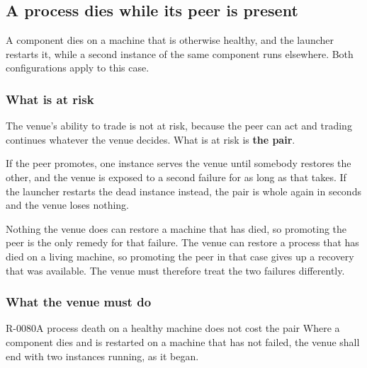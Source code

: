 \subsection{A process dies while its peer is present}
\label{sec:ha:enabled:process_death}

A component dies on a machine that is otherwise healthy, and the launcher
restarts it, while a second instance of the same component runs elsewhere. Both
configurations apply to this case.

\subsubsection{What is at risk}
\label{sec:ha:enabled:process_death:risk}

The venue's ability to trade is not at risk, because the peer can act and trading
continues whatever the venue decides. What is at risk is \textbf{the pair}.

If the peer promotes, one instance serves the venue until somebody restores the
other, and the venue is exposed to a second failure for as long as that takes. If
the launcher restarts the dead instance instead, the pair is whole again in
seconds and the venue loses nothing.

Nothing the venue does can restore a machine that has died, so promoting the peer
is the only remedy for that failure. The venue can restore a process that has
died on a living machine, so promoting the peer in that case gives up a recovery
that was available. The venue must therefore treat the two failures differently.

\subsubsection{What the venue must do}
\label{sec:ha:enabled:process_death:behaviour}

\begin{requirement}{R-0080}{A process death on a healthy machine does not cost the pair}
  Where a component dies and is restarted on a machine that has not failed, the
  venue shall end with two instances running, as it began.
\end{requirement}

